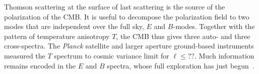 Thomson scattering at the surface of last scattering is the source of the polarization of the \ac{CMB}. It is useful 
to decompose the polarization field to two modes that are independent over the full sky, $E$ and $B$-modes. 
Together with the pattern of temperature anisotropy $T$, the \ac{CMB} thus gives three auto- and three cross-spectra. 
The {\it Planck} satellite and larger aperture ground-based instruments measured the $T$ spectrum to cosmic
variance limit for $\ell \leq ??$. Much information remains encoded in the $E$ and $B$ spectra, whose full exploration 
has just begun~\cite{planck,spt,polarbear,bicep}.   

